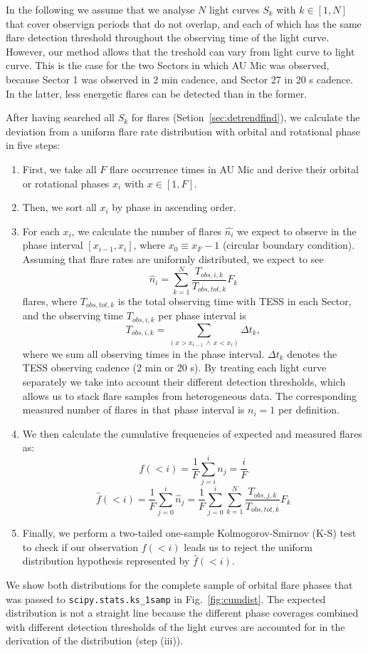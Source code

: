 \documentclass[fleqn,usenatbib,letters]{mnras}%
\begin{document}
In the following we assume that we analyse $N$ light curves $S_k$ with $k\in [1,N]$ that cover observign periods that do not overlap, and each of which has the same flare detection threshold throughout the observing time of the light curve. However, our method allows that the treshold can vary from light curve to light curve. This is the case for the two Sectors in which AU Mic was observed, because Sector 1 was observed in 2 min cadence, and Sector 27 in 20 s cadence. In the latter, less energetic flares can be detected than in the former.

After having searched all $S_k$ for flares (Setion~\ref{sec:detrendfind}), we calculate the deviation from a uniform flare rate distribution with orbital and rotational phase in five steps:
\begin{enumerate}
\item First, we take all $F$ flare occurrence times in AU Mic and derive their orbital or rotational phases $x_i$ with $x \in [1,F]$. 
\item Then, we sort all $x_i$ by phase in ascending order.
\item For each $x_i$, we calculate the number of flares $\hat{n_i}$ we expect to observe in the phase interval $[x_{i-1}, x_i]$, where $x_0\equiv x_F - 1$ (circular boundary condition). Assuming that flare rates are uniformly distributed, we expect to see
$$\hat{n}_i = \displaystyle\sum_{k=1}^N\dfrac{T_{obs, i, k}}{T_{obs, tot, k}} F_k$$
flares, where $T_{obs, tot, k}$ is the total observing time with TESS in each Sector, and the observing time $T_{obs,i,k}$ per phase interval is
$$T_{obs,i,k}=\displaystyle\sum_{(x>x_{i-1}\, \land \, x<x_i)} \Delta t_k,$$
where we sum all observing times in the phase interval. $\Delta t_k$ denotes the TESS observing cadence (2 min or 20 s). By treating each light curve separately we take into account their different detection thresholds, which allows us to stack flare samples from heterogeneous data. The corresponding measured number of flares in that phase interval is $n_i=1$ per definition.
\item We then calculate the cumulative frequencies of expected and measured flares as:
$$f(<i) = \dfrac{1}{F}\displaystyle\sum_{j=i}^{i}n_j= \dfrac{i}{F}$$
$$\hat{f}(<i) =  \dfrac{1}{F}\displaystyle\sum_{j=0}^{i}\hat{n}_j = \dfrac{1}{F}\displaystyle\sum_{j=0}^{i}\displaystyle\sum_{k=1}^N\dfrac{T_{obs, j, k}}{T_{obs, tot, k}} F_k$$
\item Finally, we perform a two-tailed one-sample Kolmogorov-Smirnov (K-S) test to check if our observation $f(<i)$ leads us to reject the uniform distribution hypothesis represented by $\hat{f}(<i)$.
\end{enumerate}
We show both distributions for the complete sample of orbital flare phases that was passed to \texttt{scipy.stats.ks\_1samp} in Fig.~\ref{fig:cumdist}. The expected distribution is not a straight line because the different phase coverages combined with different detection thresholds of the light curves are accounted for in the derivation of the distribution (step (iii)). 
\end{document}
